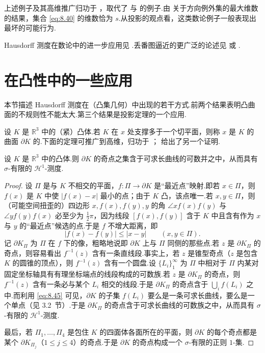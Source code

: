 上述例子及其高维推广归功于 \textcite{kaufmanmattila1975}，取代了 \textcite{marstrand1954a} 与 \textcite{kaufman1969} 的例子.由 \textcite{mattila1975b} 关于方向例外集的最大维数的结果，集合 \eqref{eq:8.40} 的维数恰为 $s$.从投影的观点看，这类数论例子一般表现出最坏的可能行为.

Hausdorff 测度在数论中的进一步应用见 \textcites{eggleston1952,bakerschmidt1970,rogers1970,baker1978}.丢番图逼近的更广泛的论述见 \textcite{baker1975} 或 \textcite{schmidt1980}.

\section{在凸性中的一些应用}

本节描述 Hausdorff 测度在（凸集几何）中出现的若干方式.前两个结果表明凸曲面的不规则性不能太大.第三个结果是投影定理的一个应用.

设 $K$ 是 $\mathbb{R}^3$ 中的（紧）凸体.若 $K$ 在 $x$ 处支撑多于一个切平面，则称 $x$ 是 $K$ 的曲面 $\partial K$ 的.下面的定理可推广到高维，归功于 \textcite{andersonklee1952}；\textcite{besicovitch1963a} 给出了另一个证明.

\begin{theorem}\label{thm:8.18}
设 $K$ 是 $\mathbb{R}^3$ 中的凸体.则 $\partial K$ 的奇点之集含于可求长曲线的可数并之中，从而具有 $\sigma$-有限的 $\mathcal{H}^1$-测度.
\end{theorem}

\begin{proof}
设 $\Pi$ 是与 $K$ 不相交的平面，$f:\Pi\to\partial K$ 是``最近点''映射.即若 $x\in\Pi$，则 $f(x)$ 是 $K$ 中使 $|f(x)-x|$ 最小的点；由于 $K$ 凸，该点唯一.若 $x,y\in\Pi$，则（可能空间扭歪的）四边形 $x,f(x),f(y),y$ 的角 $\angle xf(x)f(y)$ 与 $\angle yf(y)f(x)$ 必至少为 $\frac{1}{2}\pi$，因为线段 $[f(x),f(y)]$ 含于 $K$ 中且含有作为 $x$ 与 $y$ 的``最近点''候选的点.于是 $f$ 不增大距离，即
\begin{equation}\label{eq:8.45}
  |f(x)-f(y)|\leq|x-y|\qquad(x,y\in\Pi).
\end{equation}
记 $\partial K_{\Pi}$ 为 $\Pi$ 在 $f$ 下的像，粗略地说即 $\partial K$ 上与 $\Pi$ 同侧的那些点.若 $z$ 是 $\partial K_{\Pi}$ 的奇点，则容易看出 $f^{-1}(z)$ 含有一条直线段.事实上，若 $z$ 是锥型奇点（$z$ 是包含 $K$ 的圆锥的顶点），则 $f^{-1}(z)$ 含有一个圆盘.设 $\{L_i\}_{1}^{\infty}$ 为 $\Pi$ 中相对于 $\Pi$ 内某对固定坐标轴具有有理坐标端点的线段构成的可数族.若 $z$ 是 $\partial K_{\Pi}$ 的奇点，则 $f^{-1}(z)$ 含有一条必与某个 $L_i$ 相交的线段.于是 $\partial K_{\Pi}$ 的奇点含于 $\bigcup_i f(L_i)$ 之中.而利用 \eqref{eq:8.45} 可见，$\partial K$ 的子集 $f(L_i)$ 要么是一条可求长曲线，要么是一个单点（见 3.2~节）.于是 $\partial K_{\Pi}$ 的奇点含于可求长曲线的可数族之中，从而具有 $\sigma$-有限的 $\mathcal{H}^1$-测度.

最后，若 $\Pi_1,\ldots,\Pi_4$ 是包住 $K$ 的四面体各面所在的平面，则 $\partial K$ 的每个奇点都是某个 $\partial K_{\Pi_j}$（$1\leq j\leq 4$）的奇点.于是 $\partial K$ 的奇点构成一个 $\sigma$-有限的正则 $1$-集.
\end{proof}

